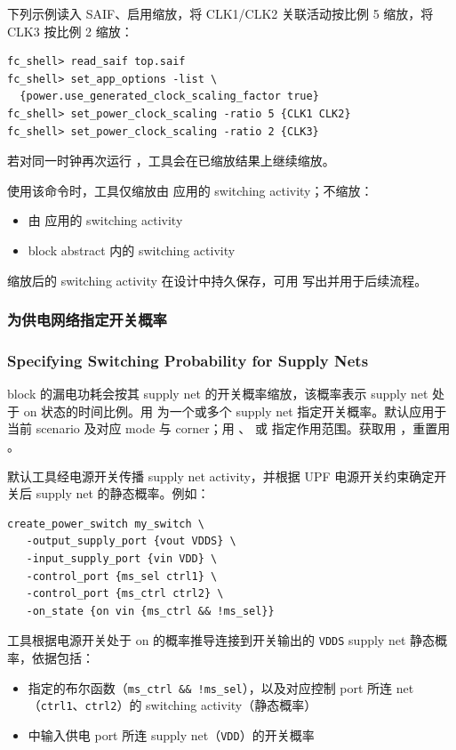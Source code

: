 下列示例读入 SAIF、启用缩放，将 CLK1/CLK2 关联活动按比例 5 缩放，将 CLK3 按比例 2 缩放：
\begin{lstlisting}
fc_shell> read_saif top.saif
fc_shell> set_app_options -list \
  {power.use_generated_clock_scaling_factor true}
fc_shell> set_power_clock_scaling -ratio 5 {CLK1 CLK2}
fc_shell> set_power_clock_scaling -ratio 2 {CLK3}
\end{lstlisting}

若对同一时钟再次运行 ，工具会在已缩放结果上继续缩放。

使用该命令时，工具仅缩放由  应用的 switching activity；不缩放：
\begin{itemize}
  \item 由  应用的 switching activity
  \item block abstract 内的 switching activity
\end{itemize}

缩放后的 switching activity 在设计中持久保存，可用  写出并用于后续流程。

\subsubsection{为供电网络指定开关概率}
\subsubsection*{Specifying Switching Probability for Supply Nets}

block 的漏电功耗会按其 supply net 的开关概率缩放，该概率表示 supply net 处于 on 状态的时间比例。用  为一个或多个 supply net 指定开关概率。默认应用于当前 scenario 及对应 mode 与 corner；用 、 或  指定作用范围。获取用 ，重置用 。

默认工具经电源开关传播 supply net activity，并根据 UPF 电源开关约束确定开关后 supply net 的静态概率。例如：
\begin{lstlisting}
create_power_switch my_switch \
   -output_supply_port {vout VDDS} \
   -input_supply_port {vin VDD} \
   -control_port {ms_sel ctrl1} \
   -control_port {ms_ctrl ctrl2} \
   -on_state {on vin {ms_ctrl && !ms_sel}}
\end{lstlisting}

工具根据电源开关处于 on 的概率推导连接到开关输出的 \texttt{VDDS} supply net 静态概率，依据包括：
\begin{itemize}
  \item \opt{-on\_state} 指定的布尔函数（\texttt{ms\_ctrl \&\& !ms\_sel}），以及对应控制 port 所连 net（\texttt{ctrl1}、\texttt{ctrl2}）的 switching activity（静态概率）
  \item \opt{-on\_state} 中输入供电 port 所连 supply net（\texttt{VDD}）的开关概率
\end{itemize}

